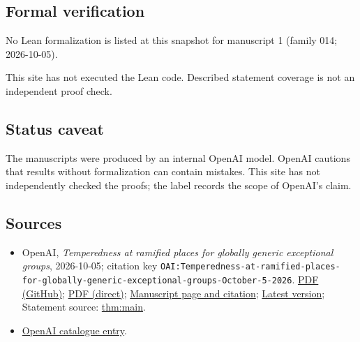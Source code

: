 \documentclass[11pt]{article}
\begin{document}
\subsection{Formal verification}
No Lean formalization is listed at this snapshot for manuscript 1 (family 014; 2026-10-05).

This site has not executed the Lean code. Described statement coverage is not an independent proof check.

\subsection{Status caveat}
The manuscripts were produced by an internal OpenAI model. OpenAI cautions that results without formalization can contain mistakes. This site has not independently checked the proofs; the label records the scope of OpenAI's claim.

\subsection{Sources}
\begin{itemize}
\item OpenAI, \emph{Temperedness at ramified places for globally generic exceptional groups}, 2026-10-05; citation key \texttt{OAI:Temperedness-at-ramified-places-for-globally-generic-exceptional-groups-October-5-2026}. \href{https://github.com/openai/math/blob/adc7f1241b42e322a6451854ab7e4b4c146bf78a/preprints/Temperedness-at-ramified-places-for-globally-generic-exceptional-groups-October-5-2026/ramified-ramanujan.pdf}{PDF (GitHub)}; \href{https://github.com/openai/math/raw/adc7f1241b42e322a6451854ab7e4b4c146bf78a/preprints/Temperedness-at-ramified-places-for-globally-generic-exceptional-groups-October-5-2026/ramified-ramanujan.pdf}{PDF (direct)}; \href{https://github.com/openai/math/blob/adc7f1241b42e322a6451854ab7e4b4c146bf78a/preprints/Temperedness-at-ramified-places-for-globally-generic-exceptional-groups-October-5-2026/README.md}{Manuscript page and citation}; \href{https://github.com/openai/math/blob/main/preprints/Temperedness-at-ramified-places-for-globally-generic-exceptional-groups-October-5-2026/ramified-ramanujan.pdf}{Latest version}; Statement source: \href{https://github.com/openai/math/blob/adc7f1241b42e322a6451854ab7e4b4c146bf78a/preprints/Temperedness-at-ramified-places-for-globally-generic-exceptional-groups-October-5-2026/build/sections/introduction.tex\#L23}{thm:main}.
\item \href{https://github.com/openai/math/blob/adc7f1241b42e322a6451854ab7e4b4c146bf78a/CONTENTS.md}{OpenAI catalogue entry}.
\end{itemize}
\end{document}
